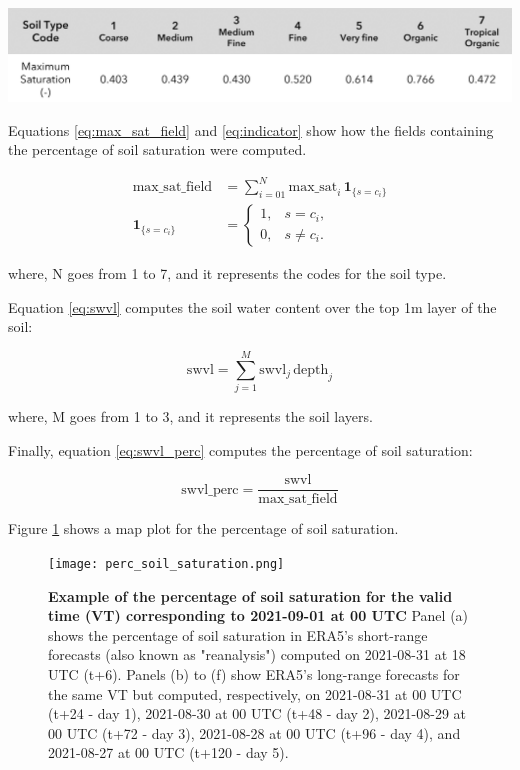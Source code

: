 \begin{table}[htbp]
\centering
{}
\includegraphics[width=\textwidth]{03_max_saturation.png}
\label{table:max_saturation}
\end{table}

Equations \ref{eq:max_sat_field} and \ref{eq:indicator} show how the fields containing the percentage of soil saturation were computed. 

\begin{align}
\text{max\_sat\_field}
  &= \sum_{i=01}^{N} \text{max\_sat}_i \,\mathbf{1}_{\{s=c_i\}}
     \label{eq:max_sat_field}\\
\mathbf{1}_{\{s=c_i\}}
  &=
  \begin{cases}
    1, & s=c_i,\\
    0, & s\neq c_i.
  \end{cases}
    \label{eq:indicator}
\end{align}

where, N goes from 1 to 7, and it represents the codes for the soil type.

Equation \ref{eq:swvl} computes the soil water content over the top 1m layer of the soil:

\begin{equation}
\label{eq:swvl}
\text{swvl} = \sum_{j=1}^{M} \text{swvl}_{j}\, \text{depth}_{j}
\end{equation}

where, M goes from 1 to 3, and it represents the soil layers.

Finally, equation \ref{eq:swvl_perc} computes the percentage of soil saturation:

\begin{equation}
\label{eq:swvl_perc}
\text{swvl\_perc} = \frac{\text{swvl}}{\text{max\_sat\_field}}
\end{equation}

Figure \ref{fig:perc_soil_saturation} shows a map plot for the percentage of soil saturation.

\begin{figure}[htbp]
\centering
\texttt{[image: perc\_soil\_saturation.png]}
\caption{\textbf{Example of the percentage of soil saturation for the valid time (VT) corresponding to 2021-09-01 at 00 UTC} Panel (a) shows the percentage of soil saturation in ERA5's short-range forecasts (also known as "reanalysis") computed on 2021-08-31 at 18 UTC (t+6). Panels (b) to (f) show ERA5's long-range forecasts for the same VT but computed, respectively, on 2021-08-31 at 00 UTC (t+24 - day 1), 2021-08-30 at 00 UTC (t+48 - day 2), 2021-08-29 at 00 UTC (t+72  - day 3), 2021-08-28 at 00 UTC (t+96 - day 4), and 2021-08-27 at 00 UTC (t+120 - day 5).}
\label{fig:perc_soil_saturation}
\end{figure}


